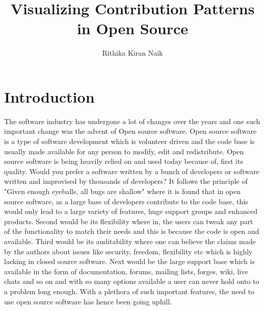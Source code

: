 \documentclass[seploa]{beavtex}
\title{Visualizing Contribution Patterns in Open Source}
\author{Rithika Kiran Naik}
\begin{document}
\maketitle

\mainmatter

\chapter{Introduction}
The software industry has undergone a lot of changes over the years and one such important change was the advent of Open source software. Open source software is a type of software development which is volunteer driven\cite{ghosh2005} and the code base is usually made available for any person to modify, edit and redistribute\cite{osdef}. Open source software is being heavily relied on and used today because of, first its quality. Would you prefer a software written by a bunch of developers or software written and improvised by thousands of developers? It follows the principle of "Given enough eyeballs, all bugs are shallow"\cite{linuslaw} where it is found that in open source software, as a large base of developers contribute to the code base, this would only lead to a large variety of features, huge support groups and enhanced products\cite{pcwr}. Second would be its flexibility where in, the users can tweak any part of the functionality to match their needs and this is because the code is open and available\cite{pcwr}. Third would be its auditability where one can believe the claims made by the authors about issues like security, freedom, flexibility etc which is highly lacking in closed source software\cite{pcwr}. Next would be the large support base which is available in the form of documentation, forums, mailing lists, forges, wiki, live chats and so on and with so many options available a user can never hold onto to a problem long enough. With a plethora of such important features, the need to use open source software has hence been going uphill.
\end{document}
